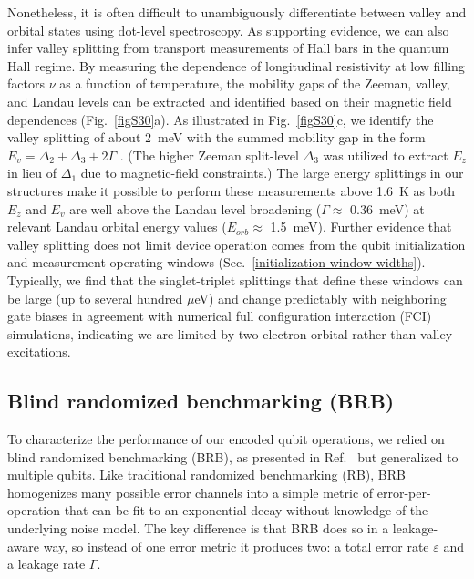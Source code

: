 \documentclass[aps,prl,twocolumn,superscriptaddress,nobibnotes,10pt,floatfix]{revtex4-2}
\newcommand{\secref}[1]{Sec.~\ref{#1}}
\newcommand{\figref}[1]{Fig.~\ref{#1}}
\begin{document}
Nonetheless, it is often difficult to unambiguously differentiate between valley and orbital states using dot-level spectroscopy.
As supporting evidence, we can also infer valley splitting from transport measurements of Hall bars in the quantum Hall regime.
By measuring the dependence of longitudinal resistivity at low filling factors \(\nu\) as a function of temperature, the mobility gaps of the Zeeman, valley, and Landau levels can be extracted and identified based on their magnetic field dependences (\figref{figS30}a).
As illustrated in \figref{figS30}c, we identify the valley splitting of about 2~meV with the summed mobility gap in the form \(E_{v} = \Delta_{2} + \Delta_{3} + 2\Gamma\) \cite{s_wuetz_vs_2020, s_stehouwer_engineering_2025}.
(The higher Zeeman split-level \(\Delta_{3}\) was utilized to extract \(E_{z}\) in lieu of \(\Delta_{1}\) due to magnetic-field constraints.)
The large energy splittings in our structures make it possible to perform these measurements above 1.6~K as both \(E_{z}\) and \(E_{v}\) are well above the Landau level broadening (\(\Gamma \approx\) 0.36~meV) at relevant Landau orbital energy values (\(E_{orb} \approx\) 1.5~meV).
Further evidence that valley splitting does not limit device operation comes from the qubit initialization and measurement operating windows (\secref{initialization-window-widths}).
Typically, we find that the singlet-triplet splittings that define these windows can be large (up to several hundred $\mu$eV) and change predictably with neighboring gate biases in agreement with numerical full configuration interaction (FCI) simulations, indicating we are limited by two-electron orbital rather than valley excitations.


\subsection{Blind randomized benchmarking (BRB)}\label{blind-randomized-benchmarking-brb}

To characterize the performance of our encoded qubit operations, we relied on blind randomized benchmarking (BRB), as presented in Ref.~\cite{s_andrews_quantifying_2019} but generalized to multiple qubits.
Like traditional randomized benchmarking (RB), BRB homogenizes many possible error channels into a simple metric of error-per-operation that can be fit to an exponential decay without knowledge of the underlying noise model.
The key difference is that BRB does so in a leakage-aware way, so instead of one error metric it produces two: a total error rate \(\varepsilon\) and a leakage rate \(\Gamma\).
\end{document}
